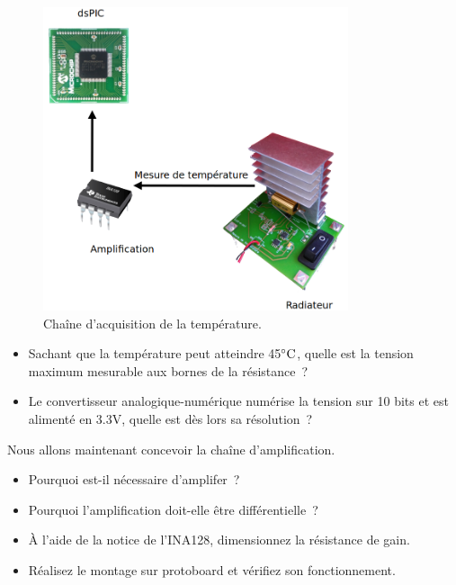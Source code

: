 \documentclass[11pt,a4paper]{article}
\theoremstyle{definition}%
\begin{document}
\begin{figure}[H]
\center
\includegraphics[width=0.8\textwidth]{acquisition}
\caption{Chaîne d'acquisition de la température.}
\label{fig:acquisition}
\end{figure}

\begin{itemize}
	\item Sachant que la température peut atteindre 45$\celsius$, quelle est la tension maximum mesurable aux bornes de la résistance~?
	\item Le convertisseur analogique-numérique numérise la tension sur 10 bits et est alimenté en 3.3V, quelle est dès lors sa résolution~?
\end{itemize}

Nous allons maintenant concevoir la chaîne d'amplification.
\begin{itemize}
	\item Pourquoi est-il nécessaire d’amplifer~?
	\item Pourquoi l’amplification doit-elle être différentielle~?
	\item À l’aide de la notice de l’INA128, dimensionnez la résistance de gain.
	\item Réalisez le montage sur protoboard et vérifiez son fonctionnement.
\end{itemize}
\end{document}
